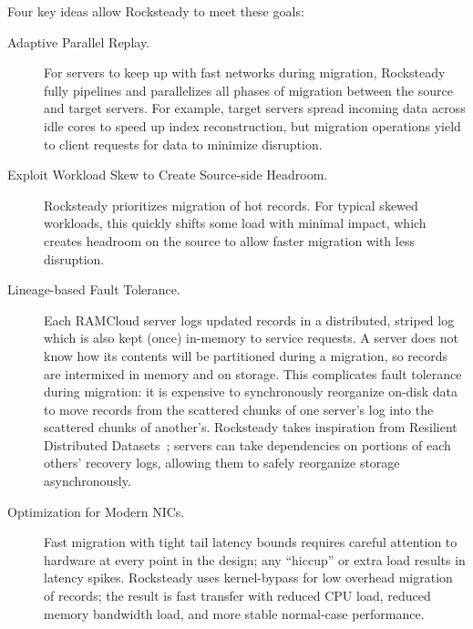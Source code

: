 \noindent
Four key ideas allow Rocksteady to meet these goals:
\begin{description}
\item[Adaptive Parallel Replay.]
For servers to keep up with fast networks during migration, Rocksteady fully
pipelines and parallelizes all phases of migration between the source and
target servers. For example, target servers spread incoming data across idle
cores to speed up index reconstruction, but migration operations yield to
client requests for data to minimize disruption.

\item[Exploit Workload Skew to Create Source-side Headroom.] Rocksteady
  prioritizes migration of hot records. For typical skewed workloads, this
  quickly shifts some load with minimal impact, which creates headroom on the
  source to allow faster migration with less disruption.

\item[Lineage-based Fault Tolerance.]
Each RAMCloud server logs updated records in a distributed, striped log which is
also kept (once) in-memory to service requests. A server does not know how its
contents will be partitioned during a migration, so records are intermixed
in memory and on storage. This complicates fault tolerance during
migration: it is expensive to synchronously reorganize on-disk data to move
records from the scattered chunks of one server's log into the scattered chunks
of another's.  Rocksteady takes inspiration from
Resilient Distributed Datasets~\cite{spark}; servers can take dependencies
on portions of each others' recovery logs, allowing them to safely
reorganize storage asynchronously.

\item[Optimization for Modern NICs.]
Fast migration with tight tail latency bounds requires careful attention to
hardware at every point in the design; any ``hiccup'' or extra load results in
latency spikes.
Rocksteady uses kernel-bypass for low overhead
migration of records;
the result is fast
transfer with reduced CPU load, reduced memory bandwidth load, and more
stable normal-case performance.

\end{description}

